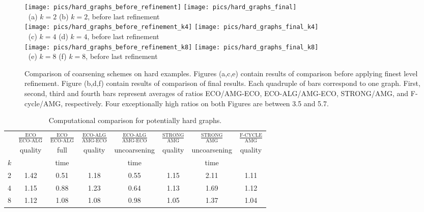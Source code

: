 \documentclass{llncs}
\begin{document}
\begin{figure}
\texttt{[image: pics/hard\_graphs\_before\_refinement]}  \hspace{-1cm}
\texttt{[image: pics/hard\_graphs\_final]}\\
$~$ \hspace{4cm} (a) $k=2$ \hspace{4cm} (b) $k=2$, before last refinement \\
\texttt{[image: pics/hard\_graphs\_before\_refinement\_k4]}  \hspace{-1cm}
\texttt{[image: pics/hard\_graphs\_final\_k4]}\\
$~$ \hspace{4cm} (c) $k=4$ \hspace{4cm} (d) $k=4$, before last refinement\\
\texttt{[image: pics/hard\_graphs\_before\_refinement\_k8]}  \hspace{-1cm}
\texttt{[image: pics/hard\_graphs\_final\_k8]}\\
$~$ \hspace{4cm} (e) $k=8$ \hspace{4cm} (f) $k=8$, before last refinement\\
\caption{Comparison of coarsening schemes on hard examples. Figures (a,c,e) contain results of comparison before applying finest level refinement. Figure (b,d,f) contain results of comparison of final results. Each quadruple of bars correspond to one graph. First, second, third and fourth bars represent averages of ratios ECO/AMG-ECO, ECO-ALG/AMG-ECO, STRONG/AMG, and F-cycle/AMG, respectively. Four exceptionally high ratios on both Figures are between 3.5 and 5.7.}\label{fig:hardgraphs}
\end{figure}
\begin{table}[t]
        
\begin{center}
\vspace*{-.25cm}
\begin{tabular}{|l|c|c||c|c||c|c||c|}
\hline
 & $\frac{\text{ECO}}{\text{ECO-ALG}}$ & $\frac{\text{ECO}}{\text{ECO-ALG}}$ & $\frac{\text{ECO-ALG}}{\text{AMG-ECO}}$ & $\frac{\text{ECO-ALG}}{\text{AMG-ECO}}$ & $\frac{\text{STRONG}}{\text{AMG}}$ & $\frac{\text{STRONG}}{\text{AMG}}$ & $\frac{\text{F-CYCLE}}{\text{AMG}}$ \\ 
 & quality & full & quality & uncoarsening & quality & uncoarsening  & quality \\ 
$k$ &         &   time   &         & time         &         & time & \\ \hline
2 & 1.42 & 0.51 & 1.18 & 0.55 & 1.15 & 2.11 & 1.11 \\ 
4 & 1.15 & 0.88 & 1.23 & 0.64 & 1.13 & 1.69 & 1.12 \\ 
8 & 1.12 & 1.08 & 1.08 & 0.98 & 1.05 & 1.37 & 1.04 \\ 
\hline
\end{tabular}
\vspace*{.25cm}
\caption{Computational comparison for potentially hard graphs. 
}\label{tab:hard}
\vspace*{-1.25cm}


\end{center}
\end{table}
\end{document}
